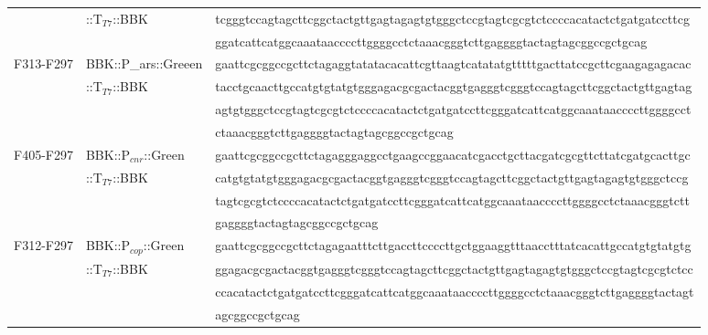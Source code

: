 \begin{table}[h]
{\begin{tabular*}{\columnwidth}{@{}lll@{}}
\\
& ::T$_{T7}$::BBK& \MakeLowercase{TCGGGTCCAGTAGCTTCGGCTACTGTTGAGTAGAGTGTGGGCTCCGTAGTCGCGTCTCCCCACATACTCTGATGATCCTTCG}
\\
& & \MakeLowercase{GGATCATTCATGGCAAATAACCCCTTGGGGCCTCTAAACGGGTCTTGAGGGGtactagtagcggccgctgcag}
\\
F313-F297 & BBK::P_{ars}::Greeen & \MakeLowercase{GAATTCGCGGCCGCTTCTAGAGGTATATACACATTCGTTAAGTCATATATGTTTTTGACTTATCCGCTTCGAAGAGAGACAC}
\\
&::T$_{T7}$::BBK & \MakeLowercase{TACCTGCAACTTGCCATGTGTATGTGGGAGACGCGACTACGGTGAGGGTCGGGTCCAGTAGCTTCGGCTACTGTTGAGTAG}
\\
& & \MakeLowercase{AGTGTGGGCTCCGTAGTCGCGTCTCCCCACATACTCTGATGATCCTTCGGGATCATTCATGGCAAATAACCCCTTGGGGCCT}
\\
& & \MakeLowercase{CTAAACGGGTCTTGAGGGGtactagtagcggccgctgcag}
\\
F405-F297 & BBK::P$_{cnr}$::Green & \MakeLowercase{GAATTCGCGGCCGCTTCTAGAGggaggcctgaagccggaacatcgacctgcttacgatcgcgttcttatcgatgcacTTGC}
\\
& ::T$_{T7}$::BBK& \MakeLowercase{CATGTGTATGTGGGAGACGCGACTACGGTGAGGGTCGGGTCCAGTAGCTTCGGCTACTGTTGAGTAGAGTGTGGGCTCCG}
\\
& & \MakeLowercase{TAGTCGCGTCTCCCCACATACTCTGATGATCCTTCGGGATCATTCATGGCAAATAACCCCTTGGGGCCTCTAAACGGGTCTT}
\\
& & \MakeLowercase{GAGGGGtactagtagcggccgctgcag}
\\
F312-F297 & BBK::P$_{cop}$::Green & \MakeLowercase{GAATTCGCGGCCGCTTCTAGAGAATTTCTTGACCTTCCCCTTGCTGGAAGGTTTAACCTTTATCACATTGCCATGTGTATGTG}
\\
& ::T$_{T7}$::BBK& \MakeLowercase{GGAGACGCGACTACGGTGAGGGTCGGGTCCAGTAGCTTCGGCTACTGTTGAGTAGAGTGTGGGCTCCGTAGTCGCGTCTCC}
\\
& & \MakeLowercase{CCACATACTCTGATGATCCTTCGGGATCATTCATGGCAAATAACCCCTTGGGGCCTCTAAACGGGTCTTGAGGGGtactagt}
\\
& & \MakeLowercase{agcggccgctgcag}

\botrule
\end{tabular*}
}
\end{table}

